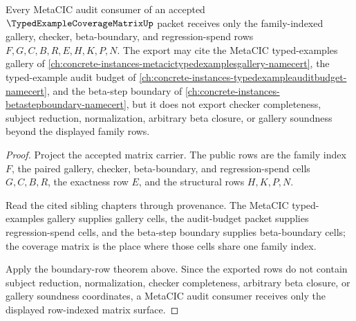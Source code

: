 \begin{theorem}
\label{thm:typed-example-coverage-matrix-public-export}
Every MetaCIC audit consumer of an accepted $\TypedExampleCoverageMatrixUp$ packet receives only the family-indexed gallery, checker, beta-boundary, and regression-spend rows $F,G,C,B,R,E,H,K,P,N$. The export may cite the MetaCIC typed-examples gallery of \autoref{ch:concrete-instances-metacictypedexamplesgallery-namecert}, the typed-example audit budget of \autoref{ch:concrete-instances-typedexampleauditbudget-namecert}, and the beta-step boundary of \autoref{ch:concrete-instances-betastepboundary-namecert}, but it does not export checker completeness, subject reduction, normalization, arbitrary beta closure, or gallery soundness beyond the displayed family rows.
\end{theorem}
\begin{proof}
Project the accepted matrix carrier. The public rows are the family index $F$, the paired gallery, checker, beta-boundary, and regression-spend cells $G,C,B,R$, the exactness row $E$, and the structural rows $H,K,P,N$.

Read the cited sibling chapters through provenance. The MetaCIC typed-examples gallery supplies gallery cells, the audit-budget packet supplies regression-spend cells, and the beta-step boundary supplies beta-boundary cells; the coverage matrix is the place where those cells share one family index.

Apply the boundary-row theorem above. Since the exported rows do not contain subject reduction, normalization, checker completeness, arbitrary beta closure, or gallery soundness coordinates, a MetaCIC audit consumer receives only the displayed row-indexed matrix surface.
\end{proof}

